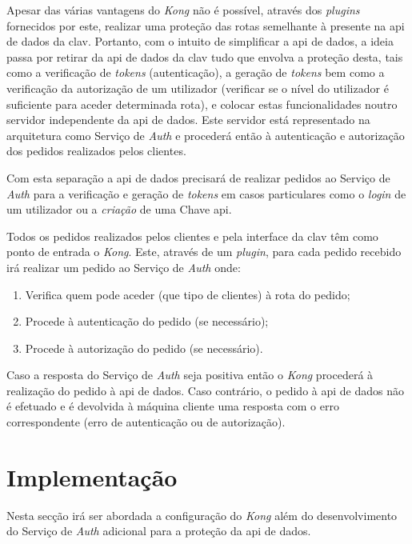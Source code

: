 Apesar das várias vantagens do \textit{Kong} não é possível, através dos \textit{plugins} fornecidos por este, 
realizar uma proteção das rotas semelhante à presente na \acrshort{api} de dados da \acrshort{clav}. 
Portanto, com o intuito de simplificar a \acrshort{api} de dados, a ideia passa por retirar da \acrshort{api} de 
dados da \acrshort{clav} tudo que envolva a proteção desta, tais como a verificação de \textit{tokens} (autenticação), 
a geração de \textit{tokens} bem como a verificação da autorização de um utilizador (verificar se o nível do 
utilizador é suficiente para aceder determinada rota), e colocar estas funcionalidades noutro servidor 
independente da \acrshort{api} de dados. Este servidor está representado na arquitetura como Serviço de 
\textit{Auth} e procederá então à autenticação e autorização dos pedidos realizados pelos clientes.

Com esta separação a \acrshort{api} de dados precisará de realizar pedidos ao Serviço de \textit{Auth} para a 
verificação e geração de \textit{tokens} em casos particulares como o \textit{login} de um utilizador ou a 
\textit{criação} de uma Chave \acrshort{api}.

Todos os pedidos realizados pelos clientes e pela interface da \acrshort{clav} têm como ponto de entrada o 
\textit{Kong}. Este, através de um \textit{plugin}, para cada pedido recebido irá realizar um pedido ao Serviço 
de \textit{Auth} onde:

\begin{enumerate}
    \item Verifica quem pode aceder (que tipo de clientes) à rota do pedido;
    \item Procede à autenticação do pedido (se necessário);
    \item Procede à autorização do pedido (se necessário).
\end{enumerate}

Caso a resposta do Serviço de \textit{Auth} seja positiva então o \textit{Kong} procederá à realização do pedido 
à \acrshort{api} de dados. Caso contrário, o pedido à \acrshort{api} de dados não é efetuado e é devolvida à máquina cliente 
uma resposta com o erro correspondente (erro de autenticação ou de autorização).

\section{Implementação}

Nesta secção irá ser abordada a configuração do \textit{Kong} além do desenvolvimento do Serviço de \textit{Auth} adicional para a proteção da \acrshort{api} de dados.

